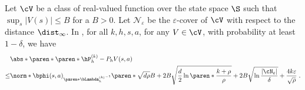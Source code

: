 \begin{lemma}\label{lemma:hP-P-V bound}
Let $\cV$ be a class of real-valued function over the state space $\S$ such that $\sup_s|V(s)| \leq B$ for a $B > 0$.
Let $\mathcal{N}_{\varepsilon}$ be the $\varepsilon$-cover of $\cV$ with respect to the distance $\dist_\infty$. 
In , for all $k, h, s, a$, for any $V \in \cV$, with probability at least $1-\delta$, we have
\begin{align*}
&\abs*{\paren*{\paren*{\hP_h^{(k)}-P_h}V}(s, a)} \\
\leq 
&\norm*{\bphi(s, a)}_{\paren*{\bLambda_h^{(k)}}^{-1} }
\paren*{
\sqrt{d\rho}B
+ 
2 B\sqrt{\frac{d}{2} \ln \paren*{\frac{k + \rho}{\rho}}}
+2B \sqrt{\ln \frac{|\cN_{\varepsilon}|}{\delta}}
+\frac{4 k \varepsilon}{\sqrt{\rho}}
}\;.
\end{align*}
\end{lemma}
